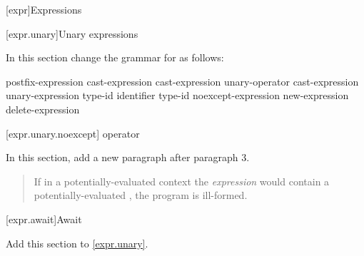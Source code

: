 

\setcounter{chapter}{4}
[expr]{Expressions}

\setcounter{section}{2}
[expr.unary]{Unary expressions}


In this section change the grammar for  as follows:

\begin{bnf}
	\br
	postfix-expression\br
	\terminal{++} cast-expression\br
	\terminal{-{-}} cast-expression\br
	\br
	unary-operator cast-expression\br
	 unary-expression\br
	 type-id \terminal{)}\br
	 \terminal{(} identifier \terminal{)}\br
	 type-id \terminal{)}\br
	noexcept-expression\br
	new-expression\br
	delete-expression\br
\end{bnf}

\setcounter{subsection}{6}
[expr.unary.noexcept]{ operator}


In this section, add a new paragraph after paragraph 3.

\begin{quote}
\setcounter{Paras}{3}
\pnum
If in a potentially-evaluated context the \textit{expression} would contain a potentially-evaluated , the program is ill-formed.
\end{quote}

\setcounter{subsection}{7}
[expr.await]{Await}

Add this section to \ref{expr.unary}.

